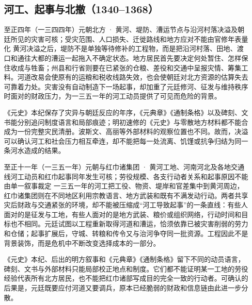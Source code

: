 \subsection{河工、起事与北撤（1340--1368）}

\begin{event}{}{至正四年（一三四四年）}{元朝北方 · 黄河、堤防、漕运节点与沿河村落}{决溢及朝廷所见的灾害可核；受灾范围、人口损失、迁徙路线和地方应对不能由官修年表量化}
黄河决溢之后，堤防不是单独等待修补的工程物，而是把沿河村落、田地、渡口和通往大都的漕运一起拖入不确定状态。地方居民首先要决定何处暂住、怎样保住收成与牲畜；州县和行省则要在已紧张的仓粮、差役和交通中呈报灾情、筹集工料。河道改易会使原有的运粮和税收线路失效，也会使朝廷对北方资源的估算失去可靠着力处。灾害没有自动制造下一场起事，却加重了元廷修河、征发与维持秩序时面对的财政压力，为一三五一年的河工动员提供了可见而危险的背景。

《元史》本纪保存了灾异与朝廷反应的年序，《元典章》《通制条格》以及碑刻、文书能分别追问制度语言和局部痕迹；明初速修的《元史》与零散地方材料都不能合成为一份完整灾民清册。波斯文、高丽等外部材料的观察位置也不同。故而，决溢可以确认河工和社会压力相互牵连，却不能把每一处流离、饥馑或抗争归结为同一条河水造成的结果。
\end{event}

\label{evt:yuan-red-turbans-1351}
\begin{event}{}{至正十一年（一三五一年）}{元朝与红巾诸集团 · 黄河工地、河南河北及各地交通线}{河工动员和红巾起事同年发生可核；劳役规模、各支行动者关系和起事原因不能由单一叙事裁定}
一三五一年的河工把工役、物资、堤岸和官差集中到黄河周边，红巾诸集团则在不同地区利用宗教语言、地方武装和既有不满发动行动。两者共享灾后财政与交通紧张的环境，却不能被压缩成“河工导致起事”的一条直线：有些人面对的是征发与工地，有些人面对的是地方武装、粮价或组织网络，行动时间和目标也不相同。元廷试图以工程重新取得河道和漕运，恰须依靠已被灾害削弱的劳力和仓储；起事扩展后，守城、转粮和传令又与治河争夺同一批资源。工程因此不是背景装饰，而是危机中不断改变选择成本的一部分。

《元史》本纪、后出的明方叙事和《元典章》《通制条格》留下不同的动员语言，碑刻、文书与外部材料只能局部校正地点和制度。它们都不能证明某一工地的劳役经验代表所有北方居民，也不能把红巾诸部写成目的完全一致的行动者。可确认的后果是，元廷既要应付河道又要调兵，原本已经脆弱的财政和信息链由此进一步分散。
\end{event}

